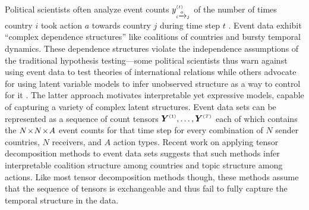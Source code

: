 \documentclass{article}
\begin{document}
Political scientists often analyze event counts $y^{\mathsmaller{(t)}}_{\mathsmaller{i \xrightarrow{a}j}}$ of the number of times country $i$ took action $a$ towards country $j$ during time step $t$ \cite{schrodt1995event}. Event data exhibit ``complex dependence structures'' \cite{king2001proper} like coalitions of countries and  bursty temporal dynamics. These dependence structures violate the independence assumptions of the traditional hypothesis testing---some political scientists thus warn against using event data to test theories of international relations \cite{green2001dirty,poast2010mis,erikson2014dyadic} while others advocate for using latent variable models to infer unobserved structure as a way to control for it \cite{stewart2014latent}. The latter approach motivates interpretable yet expressive models, capable of capturing a variety of complex latent structures. Event data sets can be represented as a sequence of count tensors $\Yten^{\mathsmaller{(1)}},\dots,\Yten^{\mathsmaller{(T)}}$ each of which contains the $N \!\times\! N \!\times\! A$ event counts for that time step for every combination of $N$ sender countries, $N$ receivers, and $A$ action types. Recent work on applying tensor decomposition methods to event data sets \cite{hoff2004modeling,hoff2015multilinear,schein2015bayesian,hoff2016equivariant,schein2016bayesian} suggests that such methods infer interpretable coalition structure among countries and topic structure among actions. Like most tensor decomposition methods though, these methods assume that the sequence of tensors is exchangeable and thus fail to fully capture the temporal structure in the data.~  
\end{document}
